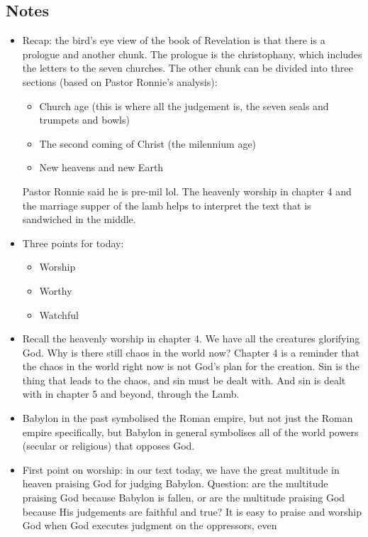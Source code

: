 \subsection*{Notes}
\begin{itemize}
  \item{Recap: the bird's eye view of the book of Revelation is that there is
  a prologue and another chunk.  The prologue is the christophany, which
  includes the letters to the seven churches.  The other chunk can be divided
  into three sections (based on Pastor Ronnie's analysis):
  \begin{itemize}
    \item{Church age (this is where all the judgement is, the seven seals and trumpets and bowls)}
    \item{The second coming of Christ (the milennium age)}
    \item{New heavens and new Earth}
  \end{itemize}
  Pastor Ronnie said he is pre-mil lol.  The heavenly worship in chapter 4
  and the marriage supper of the lamb helps to interpret the text that is
  sandwiched in the middle.}
  \item{Three points for today:
  \begin{itemize}
    \item{Worship}
    \item{Worthy}
    \item{Watchful}
  \end{itemize}}
  \item{Recall the heavenly worship in chapter 4.  We have all the creatures
  glorifying God.  Why is there still chaos in the world now?  Chapter 4 is a
  reminder that the chaos in the world right now is not God's plan for the
  creation.  Sin is the thing that leads to the chaos, and sin must be dealt
  with.  And sin is dealt with in chapter 5 and beyond, through the Lamb.}
  \item{Babylon in the past symbolised the Roman empire, but not just the
  Roman empire specifically, but Babylon in general symbolises all of the
  world powers (secular or religious) that opposes God.}
  \item{First point on worship: in our text today, we have the great
  multitude in heaven praising God for judging Babylon.  Question: are the
  multitude praising God because Babylon is fallen, or are the multitude
  praising God because His judgements are faithful and true?  It is easy to
  praise and worship God when God executes judgment on the oppressors, even
}
\end{itemize}
